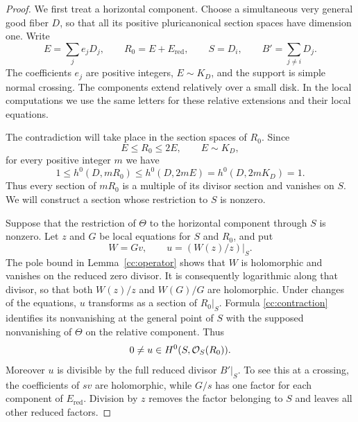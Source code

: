 \begin{proof}
We first treat a horizontal component.  Choose a simultaneous very
general good fiber $D$, so that all its positive pluricanonical section
spaces have dimension one.  Write
\begin{equation}
 E=\sum_j e_jD_j,\qquad R_0=E+E_{\mathrm{red}},\qquad
 S=D_i,\qquad B'=\sum_{j\ne i}D_j.
\label{cc:zero-data}
\end{equation}
The coefficients $e_j$ are positive integers, $E\sim K_D$, and the
support is simple normal crossing.  The components extend relatively
over a small disk.  In the local computations we use the same letters
for these relative extensions and their local equations.

The contradiction will take place in the section spaces of $R_0$.
Since
\[
                   E\le R_0\le2E,\qquad E\sim K_D,
\]
for every positive integer $m$ we have
\[
       1\le h^0(D,mR_0)\le h^0(D,2mE)
                              =h^0(D,2mK_D)=1.
\]
Thus every section of $mR_0$ is a multiple of its divisor section
and vanishes on $S$. We will construct a section whose restriction
to $S$ is nonzero.

Suppose that the restriction of $\Theta$ to the horizontal component
through $S$ is nonzero.  Let $z$ and $G$ be local equations for $S$ and
$R_0$, and put
\[
                   W=Gv,\qquad u=(W(z)/z)|_S.
\]
The pole bound in Lemma~\ref{cc:operator} shows that $W$ is holomorphic
and vanishes on the reduced zero divisor.  It is consequently
logarithmic along that divisor, so that both $W(z)/z$ and $W(G)/G$ are
holomorphic.  Under changes of the equations, $u$ transforms as a
section of $R_0|_S$.  Formula \eqref{cc:contraction} identifies its
nonvanishing at the general point of $S$ with the supposed nonvanishing
of $\Theta$ on the relative component.  Thus
\begin{equation}
                0\ne u\in H^0(S,\mathcal O_S(R_0)).
\label{cc:u}
\end{equation}
Moreover $u$ is divisible by the full reduced divisor $B'|_S$.  To see
this at a crossing, the coefficients of $sv$ are holomorphic, while
$G/s$ has one factor for each component of $E_{\mathrm{red}}$.
Division by $z$ removes the factor belonging to $S$ and leaves all
other reduced factors.


\end{proof}
